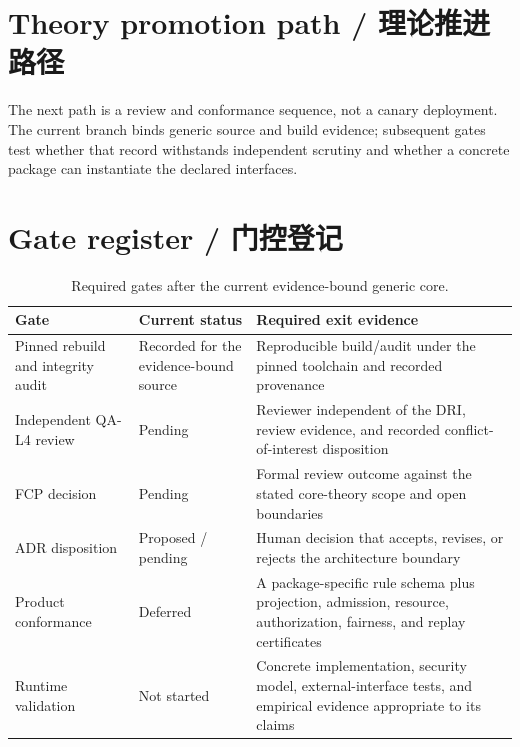 \label{ch:deployment}

\section{Theory promotion path / 理论推进路径}

The next path is a review and conformance sequence, not a canary deployment. The current branch
binds generic source and build evidence; subsequent gates test whether that record withstands
independent scrutiny and whether a concrete package can instantiate the declared interfaces.



\section{Gate register / 门控登记}

\begin{table}[H]
\centering
\caption{Required gates after the current evidence-bound generic core.}
\label{tab:monitoring}
\begin{tabularx}{\textwidth}{@{}L{0.23\textwidth}L{0.20\textwidth}Y@{}}
\toprule
{}
\textbf{Gate} & \textbf{Current status} & \textbf{Required exit evidence} \\
\midrule
Pinned rebuild and integrity audit & Recorded for the evidence-bound source & Reproducible build/audit under the pinned toolchain and recorded provenance \\
Independent QA-L4 review & Pending & Reviewer independent of the DRI, review evidence, and recorded conflict-of-interest disposition \\
FCP decision & Pending & Formal review outcome against the stated core-theory scope and open boundaries \\
ADR disposition & Proposed / pending & Human decision that accepts, revises, or rejects the architecture boundary \\
Product conformance & Deferred & A package-specific rule schema plus projection, admission, resource, authorization, fairness, and replay certificates \\
Runtime validation & Not started & Concrete implementation, security model, external-interface tests, and empirical evidence appropriate to its claims \\
\bottomrule
\end{tabularx}
\end{table}

